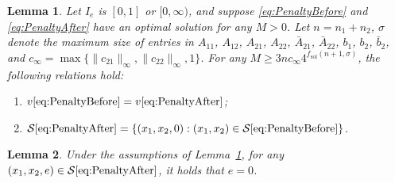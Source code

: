 \documentclass[10pt,a4paper]{amsart}
\newtheorem{lemma}{Lemma}
\newcommand{\EncodingSize}{size}
\newcommand{\MacroColor}[1]{#1}
\newcommand{\NVariables}{\MacroColor{n}}
\newcommand{\OptSolSet}{\MacroColor{\mathcal{S}}}
\newcommand{\OptValFunc}{\MacroColor{v}}
\newcommand{\ReformPen}{\MacroColor{e}}
\newcommand{\SolutionSizeEstimate}{\MacroColor{f_{\mathrm{sol}}}}
\begin{document}
\begin{lemma}
\label{lemma:PenaltyReformulation}
Let $I_{\ReformPen}$ is $[0, 1]$ or $[0, \infty)$, and suppose \eqref{eq:PenaltyBefore} and \eqref{eq:PenaltyAfter} have an optimal solution for any $M > 0$.
Let $\NVariables = \NVariables_1 + \NVariables_2$, $\sigma$ denote the maximum \EncodingSize{} of entries in $A_{1 1}$, $A_{1 2}$, $A_{2 1}$, $A_{2 2}$, $\bar{A}_{2 1}$, $\bar{A}_{2 2}$, $b_1$, $b_2$, $\bar{b}_2$, and $c_{\infty} = \max\{ \| c_{2 1} \|_{\infty}, \| c_{2 2} \|_{\infty}, 1 \}$.
For any $M \ge 3 \NVariables c_{\infty} 4^{\SolutionSizeEstimate(\NVariables + 1, \sigma)}$, the following relations hold:
\begin{enumerate}
\item $\OptValFunc\eqref{eq:PenaltyBefore} = \OptValFunc\eqref{eq:PenaltyAfter}$;
\item $\OptSolSet\eqref{eq:PenaltyAfter} = \{(x_1, x_2, 0) : (x_1, x_2) \in \OptSolSet\eqref{eq:PenaltyBefore} \}$.
\end{enumerate}
\end{lemma}

\begin{lemma}
\label{lemma:ZeroViolation}
Under the assumptions of Lemma~\ref{lemma:PenaltyReformulation}, for any $(x_1, x_2, e) \in \OptSolSet\eqref{eq:PenaltyAfter}$, it holds that $e = 0$.
\end{lemma}
\end{document}
